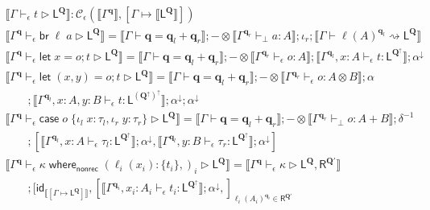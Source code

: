 \documentclass[acmsmall,screen,review]{acmart}
\newcommand{\mc}[1]{\ensuremath{\mathcal{#1}}}
\newcommand{\mb}[1]{\ensuremath{\mathbf{#1}}}
\newcommand{\ms}[1]{\ensuremath{\mathsf{#1}}}
\newcommand{\lto}{:}
\newcommand{\linl}[1]{\iota_l\;{#1}}
\newcommand{\linr}[1]{\iota_r\;{#1}}
\newcommand{\letstmt}[3]{\ensuremath{\ms{let}\;#1 = #2; #3}}
\newcommand{\brb}[2]{\ms{br}\;#1\;#2}
\newcommand{\casestmt}[5]{\ms{case}\;#1\;\{\linl{#2} \lto #3, \linr{#4} \lto #5\}}
\newcommand{\awhere}[2]{#1\;\ms{where}_{\ms{nonrec}}\;#2}
\newcommand{\wbranch}[3]{#1(#2) \lto \{#3\}}
\newcommand{\qsp}[4]{#1 \vdash #2 = #3 + #4}
\newcommand{\lwk}[3]{#1 \vdash #2 \rightsquigarrow #3}
\newcommand{\lhyp}[2]{#1(#2)}
\newcommand{\hasty}[4]{#1 \vdash_{#2} #3: {#4}}
\newcommand{\haslb}[4]{#1 \vdash_{#2} #3 \rhd #4}
\newcommand{\ltoty}[2]{[#1 \mapsto #2]}
\newcommand{\dnt}[1]{\llbracket{#1}\rrbracket}
\newcommand{\zeroqv}[1]{#1^\uparrow}
\begin{document}
\begin{figure}
  \begin{gather*}
    \boxed{\dnt{\haslb{\Gamma}{\epsilon}{t}{\ms{L}^{\mb{Q}}}}
    : \mc{C}_\epsilon(\dnt{\Gamma^{\mb{q}}}, \ltoty{\Gamma}{\dnt{\ms{L}^{\mb{Q}}}})} \\
    \dnt
    {\haslb{\Gamma^{\mb{q}}}{\epsilon}{\brb{\ell}{a}}{\ms{L}^{\mb{Q}}}}
    = \dnt{\qsp{\Gamma}{\mb{q}}{\mb{q}_l}{\mb{q}_r}}
    ; - \otimes \dnt{\hasty{\Gamma^{\mb{q}_r}}{\bot}{a}{A}}
    ; \iota_r
    ; \dnt{\lwk{\Gamma}{\lhyp{\ell}{A}^{\mb{q}_l}}{\ms{L}^{\mb{Q}}}}
    \\
    \dnt
    {\haslb{\Gamma^{\mb{q}}}{\epsilon}{\letstmt{x}{o}{t}}{\ms{L}^{\mb{Q}}}}
    =
    \dnt{\qsp{\Gamma}{\mb{q}}{\mb{q}_l}{\mb{q}_r}}
    ; - \otimes \dnt{\hasty{\Gamma^{\mb{q}_r}}{\epsilon}{o}{A}}
    ; \dnt{\hasty{\Gamma^{\mb{q}_l}, x : A}{\epsilon}{t}{\ms{L}^{\zeroqv{\mb{Q}}}}}
    ; \alpha^\downarrow \\
    \dnt
    {\haslb{\Gamma^{\mb{q}}}{\epsilon}{\letstmt{(x, y)}{o}{t}}{\ms{L}^{\mb{Q}}}}
    =
    \dnt{\qsp{\Gamma}{\mb{q}}{\mb{q}_l}{\mb{q}_r}}
    ; - \otimes \dnt{\hasty{\Gamma^{\mb{q}_r}}{\epsilon}{o}{A \otimes B}}
    ; \alpha
    \\
    \qquad 
    ; \dnt{\hasty{\Gamma^{\mb{q}_l}, x : A, y : B}{\epsilon}{t}
      {\ms{L}^{\zeroqv{(\zeroqv{\mb{Q}})}}}}
    ; \alpha^\downarrow ; \alpha^\downarrow
    \\
    \dnt
    {\haslb{\Gamma^{\mb{q}}}{\epsilon}{\casestmt{o}{x}{\tau_l}{y}{\tau_r}}
      {\ms{L}^{\mb{Q}}}}
    = \dnt{\qsp{\Gamma}{\mb{q}}{\mb{q}_l}{\mb{q}_r}}
    ; - \otimes \dnt{\hasty{\Gamma^{\mb{q}_r}}{\bot}{o}{A + B}}
    ; \delta^{-1}
    \\
    \qquad
    ; [
      \dnt{\hasty{\Gamma^{\mb{q}_l}, x : A}{\epsilon}{\tau_l}{\ms{L}^{\zeroqv{\mb{Q}}}}}
        ; \alpha^\downarrow,
      \dnt{\hasty{\Gamma^{\mb{q}_l}, y : B}{\epsilon}{\tau_r}{\ms{L}^{\zeroqv{\mb{Q}}}}}
        ; \alpha^\downarrow
    ]
    \\
    \dnt
    {\haslb{\Gamma^{\mb{q}}}{\epsilon}{\awhere{\kappa}{(\wbranch{\ell_i}{x_i}{t_i},)_i}}
      {\ms{L}^{\mb{Q}}}}
    =
    \dnt{\haslb{\Gamma^{\mb{q}}}{\epsilon}{\kappa}
      {\ms{L}^{\mb{Q}}, \ms{R}^{\mb{Q}'}}}
    \\ 
    \qquad ; [
      \ms{id}_{\dnt{\ltoty{\Gamma}{\ms{L}^{\mb{Q}}}}},
      [
        \dnt{\hasty{\Gamma^{\mb{q}_i}, x_i : A_i}{\epsilon}{t_i}
          {\ms{L}^{\zeroqv{\mb{Q}}}}} ; \alpha^\downarrow,
      ]_{\ell_i(A_i)^{\mb{q}_i} \in \ms{R}^{\mb{Q}'}}

\end{gather*}
\end{figure}
\end{document}
